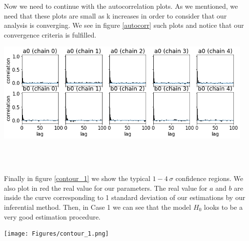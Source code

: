 \documentclass[onecolumn,           %
               showpacs,            %
               preprintnumbers,     %
               aps,                 %
               prl,          	    %
               letterpaper,             %
               superscriptaddress,      %
               nofootinbib,         %
               tightenlines,        %
               floats,floatfix      %
               ,usenatbib,
               ]{revtex4-1}
\begin{document}
Now we need to continue with the autocorrelation plots. As we mentioned, we need that these plots are small as k increases in order to consider that our analysis is converging. We see in figure \ref{autocorr} such plots and notice that our convergence criteria is fulfilled.

\begin{minipage}{\textwidth}
\centering
\includegraphics[height=5cm]{Figures/autocorr_1.png}
\label{autocorr}
\end{minipage}
\\$ $

Finally in figure \ref{contour_1} we show the typical $1-4\ \sigma$ confidence regions. We also plot in red the real value for our parameters. The real value for $a$ and $b$ are inside the curve corresponding to 1 standard deviation of our estimations by our inferential method. Then, in Case 1 we can see that the model $H_0$ looks to be a very good estimation procedure.

\begin{minipage}{\textwidth}
\centering
\texttt{[image: Figures/contour\_1.png]}
\label{contour_1}
\end{minipage}\\ $ $
\end{document}
